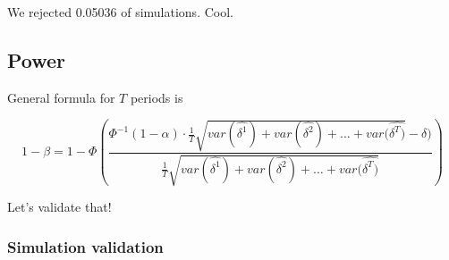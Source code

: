 \documentclass[
]{article}
\begin{document}
We rejected 0.05036 of simulations. Cool.

\hypertarget{power-2}{%
\subsection{Power}\label{power-2}}

General formula for \(T\) periods is

\[\boxed{1- \beta = 1 - \Phi\left(\frac{\Phi^{-1}(1 - \alpha) \cdot \frac{1}{T} \sqrt{var(\hat{\delta^1}) + var(\hat{\delta^2}) + \dots + var(\hat{\delta^T)}} - \delta)}{\frac{1}{T}\sqrt{var(\hat{\delta^1}) + var(\hat{\delta^2}) + \dots + var(\hat{\delta^T)}}}\right)}\]

Let's validate that!

\hypertarget{simulation-validation-6}{%
\subsubsection{Simulation validation}\label{simulation-validation-6}}
\end{document}
